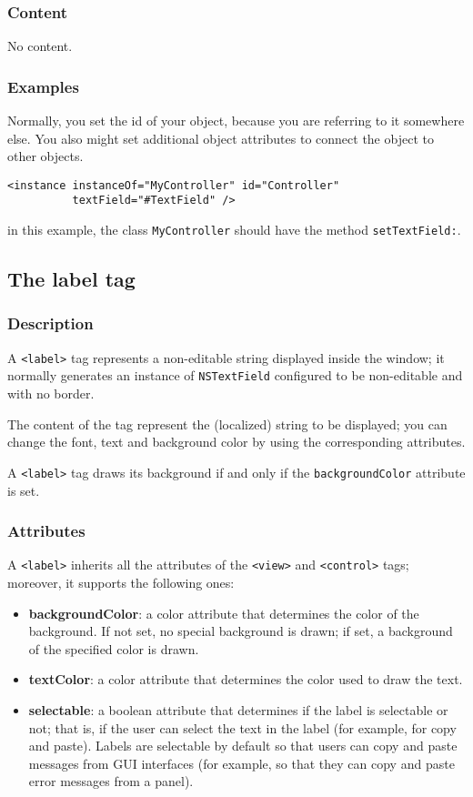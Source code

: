 \subsubsection{Content}
No content.

\subsubsection{Examples}
Normally, you set the id of your object, because you are referring to
it somewhere else.  You also might set additional object attributes to
connect the object to other objects.
\begin{verbatim}
<instance instanceOf="MyController" id="Controller" 
          textField="#TextField" />
\end{verbatim}
in this example, the class \texttt{MyController} should have the method
\texttt{setTextField:}.

\subsection{The label tag}

\subsubsection{Description}
A \texttt{<label>} tag represents a non-editable string displayed
inside the window; it normally generates an instance of
\texttt{NSTextField} configured to be non-editable and with no border.

The content of the tag represent the (localized) string to be
displayed; you can change the font, text and background color by using
the corresponding attributes.

A \texttt{<label>} tag draws its background if and only if the
\texttt{backgroundColor} attribute is set.

\subsubsection{Attributes}
A \texttt{<label>} inherits all the attributes of the \texttt{<view>}
and \texttt{<control>} tags; moreover, it supports the following ones:
\begin{itemize}
\item {\bf backgroundColor}: a color attribute that determines the
  color of the background.  If not set, no special background is
  drawn; if set, a background of the specified color is drawn.
\item {\bf textColor}: a color attribute that determines the color
  used to draw the text.
\item {\bf selectable}: a boolean attribute that determines if the
  label is selectable or not; that is, if the user can select the text
  in the label (for example, for copy and paste).  Labels are
  selectable by default so that users can copy and paste messages from
  GUI interfaces (for example, so that they can copy and paste error
  messages from a panel).
\end{itemize}

